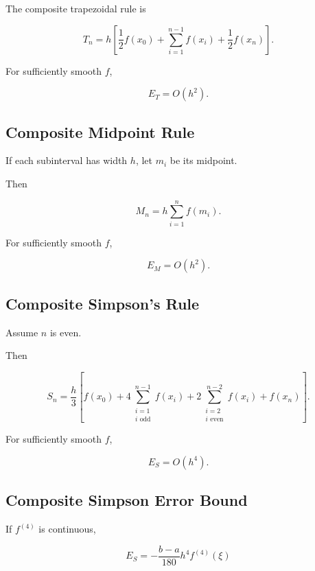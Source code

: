 The composite trapezoidal rule is

\[
\boxed{
T_n
=
h
\left[
\frac12f(x_0)
+
\sum_{i=1}^{n-1}
f(x_i)
+
\frac12f(x_n)
\right].
}
\]

For sufficiently smooth \(f\),

\[
\boxed{
E_T
=
O(h^2).
}
\]

\subsection{Composite Midpoint Rule}
\label{subsec:composite-midpoint}

If each subinterval has width \(h\), let \(m_i\) be its midpoint.

Then

\[
\boxed{
M_n
=
h
\sum_{i=1}^{n}
f(m_i).
}
\]

For sufficiently smooth \(f\),

\[
\boxed{
E_M
=
O(h^2).
}
\]

\subsection{Composite Simpson's Rule}
\label{subsec:composite-simpson}

Assume \(n\) is even.

Then

\[
\boxed{
S_n
=
\frac{h}{3}
\left[
f(x_0)
+
4
\sum_{\substack{i=1\\i\text{ odd}}}^{n-1}
f(x_i)
+
2
\sum_{\substack{i=2\\i\text{ even}}}^{n-2}
f(x_i)
+
f(x_n)
\right].
}
\]

For sufficiently smooth \(f\),

\[
\boxed{
E_S
=
O(h^4).
}
\]

\subsection{Composite Simpson Error Bound}
\label{subsec:composite-simpson-error}

If \(f^{(4)}\) is continuous,

\[
\boxed{
E_S
=
-
\frac{
b-a
}{
180
}
h^4
f^{(4)}(\xi)
}
\]

